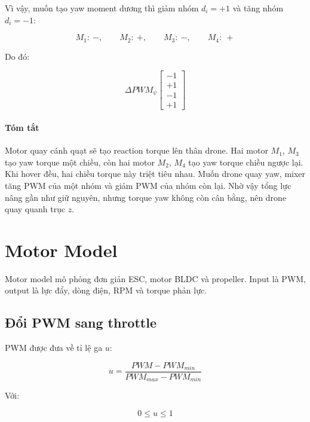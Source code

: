 Vì vậy, muốn tạo yaw moment dương thì giảm nhóm $d_i=+1$ và tăng nhóm
$d_i=-1$:

\begin{equation}
    M_1:\ -,\qquad
    M_2:\ +,\qquad
    M_3:\ -,\qquad
    M_4:\ +
\end{equation}

Do đó:

\begin{equation}
    \Delta PWM_\psi
    \begin{bmatrix}
        -1\\
        +1\\
        -1\\
        +1
    \end{bmatrix}
\end{equation}

\paragraph{Tóm tắt}

Motor quay cánh quạt sẽ tạo reaction torque lên thân drone. Hai motor $M_1$,
$M_3$ tạo yaw torque một chiều, còn hai motor $M_2$, $M_4$ tạo yaw torque chiều
ngược lại. Khi hover đều, hai chiều torque này triệt tiêu nhau. Muốn drone quay
yaw, mixer tăng PWM của một nhóm và giảm PWM của nhóm còn lại. Nhờ vậy tổng lực
nâng gần như giữ nguyên, nhưng torque yaw không còn cân bằng, nên drone quay
quanh trục $z$.

\section{Motor Model}

Motor model mô phỏng đơn giản ESC, motor BLDC và propeller. Input là PWM, output
là lực đẩy, dòng điện, RPM và torque phản lực.

\subsection{Đổi PWM sang throttle}

PWM được đưa về tỉ lệ ga $u$:

\begin{equation}
    u
    =
    \frac{PWM-PWM_{min}}{PWM_{max}-PWM_{min}}
\end{equation}

Với:

\begin{equation}
    0 \leq u \leq 1
\end{equation}

